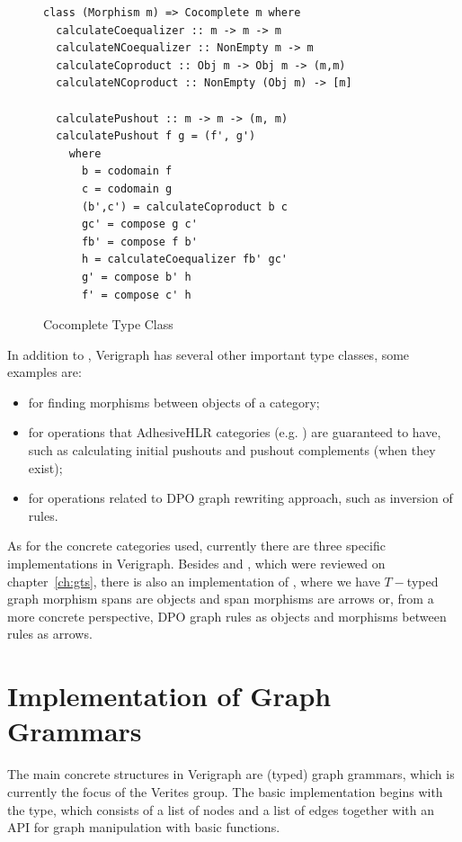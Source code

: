 \begin{figure}[!ht]
  \begin{verbatim}
class (Morphism m) => Cocomplete m where
  calculateCoequalizer :: m -> m -> m
  calculateNCoequalizer :: NonEmpty m -> m
  calculateCoproduct :: Obj m -> Obj m -> (m,m)
  calculateNCoproduct :: NonEmpty (Obj m) -> [m]

  calculatePushout :: m -> m -> (m, m)
  calculatePushout f g = (f', g')
    where
      b = codomain f
      c = codomain g
      (b',c') = calculateCoproduct b c
      gc' = compose g c'
      fb' = compose f b'
      h = calculateCoequalizer fb' gc'
      g' = compose b' h
      f' = compose c' h
\end{verbatim}
\caption{Cocomplete Type Class}\label{fig:verigraph:cocomplete-type-class}
\end{figure}

In addition to , Verigraph has several other important type classes, some examples are:
\begin{itemize}
  \item {} for finding morphisms between objects of a category;
  \item {} for operations that AdhesiveHLR categories (e.g. ) are guaranteed to have, such as calculating initial pushouts and pushout complements (when they exist);
  \item {} for operations related to DPO graph rewriting approach, such as inversion of rules.
\end{itemize}

As for the concrete categories used, currently there are three specific implementations in Verigraph. Besides  and , which were reviewed on chapter~\ref{ch:gts}, there is also an implementation of , where we have $T-$typed graph morphism spans are objects and span morphisms are arrows or, from a more concrete perspective, DPO graph rules as objects and morphisms between rules as arrows.

\section{Implementation of Graph Grammars}

The main concrete structures in Verigraph are (typed) graph grammars, which is currently the focus of the Verites group. The basic implementation begins with the  type, which consists of a list of nodes and a list of edges together with an API for graph manipulation with basic functions.

